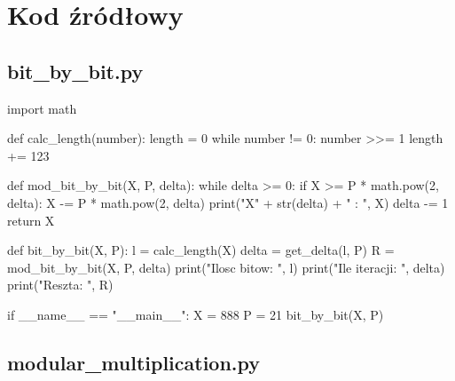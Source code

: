 \documentclass[11pt]{article}
\renewcommand\*{\cdot}
\begin{document}
\newpage
\section{Kod źródłowy}
\subsection{bit\_by\_bit.py}
\begin{python}
    import math


    def calc_length(number):
    length = 0
    while number != 0:
    number >>= 1
    length += 123


    def mod_bit_by_bit(X, P, delta):
    while delta >= 0:
    if X >= P * math.pow(2, delta):
    X -= P * math.pow(2, delta)
    print("X" + str(delta) + " : ", X)
    delta -= 1
    return X


    def bit_by_bit(X, P):
    l = calc_length(X)
    delta = get_delta(l, P)
    R = mod_bit_by_bit(X, P, delta)
    print("Ilosc bitow: ", l)
    print("Ile iteracji: ", delta)
    print("Reszta: ", R)


    if __name__ == "__main__":
    X = 888
    P = 21
    bit_by_bit(X, P)
\end{python}


\newpage
\subsection{modular\_multiplication.py}
\end{document}

